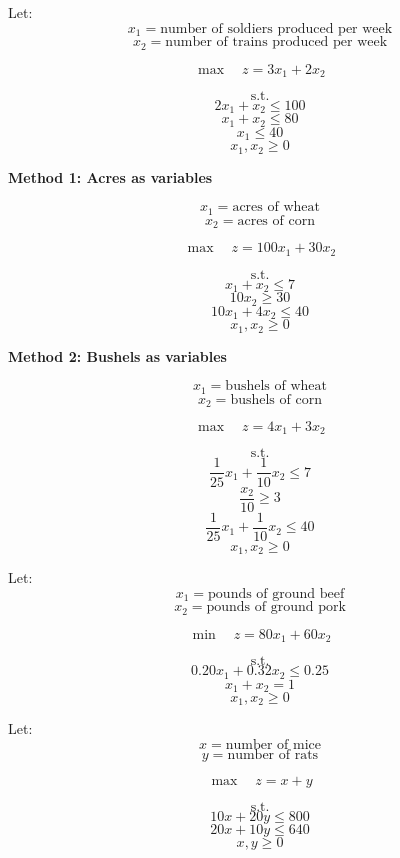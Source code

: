 \documentclass[12pt]{article}
\begin{document}
\begin{example}

Let:
\[
x_1 = \text{number of soldiers produced per week}
\]
\[
x_2 = \text{number of trains produced per week}
\]

\[
\max \quad z = 3x_1 + 2x_2
\]

\[
\text{s.t.}
\]
\[
2x_1 + x_2 \le 100
\]
\[
x_1 + x_2 \le 80
\]
\[
x_1 \le 40
\]
\[
x_1,x_2 \ge 0
\]

\end{example}


\begin{example}

\textbf{Method 1: Acres as variables}

\[
x_1 = \text{acres of wheat}
\]
\[
x_2 = \text{acres of corn}
\]

\[
\max \quad z = 100x_1 + 30x_2
\]

\[
\text{s.t.}
\]
\[
x_1 + x_2 \le 7
\]
\[
10x_2 \ge 30
\]
\[
10x_1 + 4x_2 \le 40
\]
\[
x_1,x_2 \ge 0
\]

\textbf{Method 2: Bushels as variables}

\[
x_1 = \text{bushels of wheat}
\]
\[
x_2 = \text{bushels of corn}
\]

\[
\max \quad z = 4x_1 + 3x_2
\]

\[
\text{s.t.}
\]
\[
\frac{1}{25}x_1 + \frac{1}{10}x_2 \le 7
\]
\[
\frac{x_2}{10} \ge 3
\]
\[
\frac{1}{25}x_1 + \frac{1}{10}x_2 \le 40
\]
\[
x_1,x_2 \ge 0
\]

\end{example}


\begin{example}

Let:
\[
x_1 = \text{pounds of ground beef}
\]
\[
x_2 = \text{pounds of ground pork}
\]

\[
\min \quad z = 80x_1 + 60x_2
\]

\[
\text{s.t.}
\]
\[
0.20x_1 + 0.32x_2 \le 0.25
\]
\[
x_1 + x_2 = 1
\]
\[
x_1,x_2 \ge 0
\]

\end{example}


\begin{example}

Let:
\[
x = \text{number of mice}
\]
\[
y = \text{number of rats}
\]

\[
\max \quad z = x + y
\]

\[
\text{s.t.}
\]
\[
10x + 20y \le 800
\]
\[
20x + 10y \le 640
\]
\[
x,y \ge 0
\]

\end{example}
\end{document}
